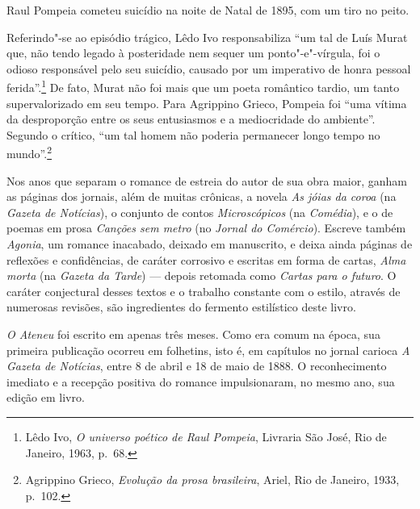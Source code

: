 Raul Pompeia cometeu suicídio na noite de Natal de 1895, com um tiro no peito.
\asterisc

Referindo"-se ao episódio trágico, Lêdo Ivo
responsabiliza ``um tal de Luís Murat que, não tendo legado à
posteridade nem sequer um ponto"-e"-vírgula, foi o odioso responsável
pelo seu suicídio, causado por um imperativo de honra pessoal
ferida''.\footnote{Lêdo Ivo, \textit{O universo poético de Raul
Pompeia}, Livraria São José, Rio de Janeiro, 1963, p.~68.} 
De fato, Murat não foi mais que um poeta
romântico tardio, um tanto supervalorizado em seu tempo. Para Agrippino
Grieco, Pompeia foi ``uma vítima da desproporção entre os seus
entusiasmos e a mediocridade do ambiente''. Segundo o crítico, ``um tal
homem não poderia permanecer longo tempo no mundo''.\footnote{Agrippino Grieco, 
\textit{Evolução da prosa brasileira}, Ariel, Rio de Janeiro, 1933, p.~102.}  

Nos anos que separam o romance de estreia do autor de
sua obra maior, ganham as páginas dos jornais, além de muitas crônicas,
a novela \textit{As jóias da coroa} (na
\textit{Gazeta de Notícias}), o conjunto de
contos \textit{Microscópicos} (na
\textit{Comédia}), e o de poemas em prosa
\textit{Canções sem metro} (no
\textit{Jornal do Comércio}). Escreve também
\textit{Agonia}, um romance inacabado,
deixado em manuscrito, e deixa ainda páginas de reflexões e
confidências, de caráter corrosivo e escritas em forma de cartas,
\textit{Alma morta} (na \textit{Gazeta da Tarde}) --- depois retomada
como \textit{Cartas para o futuro}. O
caráter conjectural desses textos e o trabalho constante com o estilo,
através de numerosas revisões, são ingredientes do fermento estilístico
deste livro.  

\textit{O Ateneu} foi escrito
em apenas três meses. Como era comum na época, sua primeira publicação
ocorreu em folhetins, isto é, em capítulos no jornal carioca
\textit{A Gazeta de Notícias}, entre 8 de
abril e 18 de maio de 1888. O reconhecimento imediato e a recepção
positiva do romance impulsionaram, no mesmo ano, sua edição em livro.

